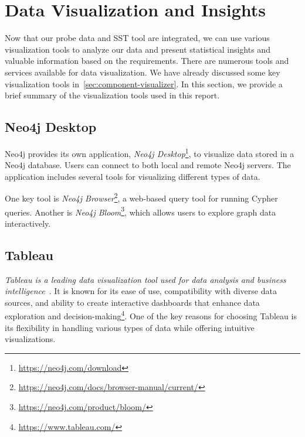 \section{Data Visualization and Insights}\label{sec:data_visualization}

Now that our probe data and SST tool are integrated, we can use various visualization tools to analyze our data and present statistical insights and valuable information based on the requirements. There are numerous tools and services available for data visualization. We have already discussed some key visualization tools in~\autoref{sec:component-visualizer}. In this section, we provide a brief summary of the visualization tools used in this report.

\subsection{Neo4j Desktop}
Neo4j provides its own application, \textit{Neo4j Desktop}\footnote{\url{https://neo4j.com/download}}, to visualize data stored in a Neo4j database. Users can connect to both local and remote Neo4j servers. The application includes several tools for visualizing different types of data.

One key tool is \textit{Neo4j Browser}\footnote{\url{https://neo4j.com/docs/browser-manual/current/}}, a web-based query tool for running Cypher queries. Another is \textit{Neo4j Bloom}\footnote{\url{https://neo4j.com/product/bloom/}}, which allows users to explore graph data interactively.


\subsection{Tableau}
\textit{Tableau is a leading data visualization tool used for data analysis and business intelligence}~\citep{biswal2024visualization}. It is known for its ease of use, compatibility with diverse data sources, and ability to create interactive dashboards that enhance data exploration and decision-making\footnote{\url{https://www.tableau.com/}}. One of the key reasons for choosing Tableau is its flexibility in handling various types of data while offering intuitive visualizations.

